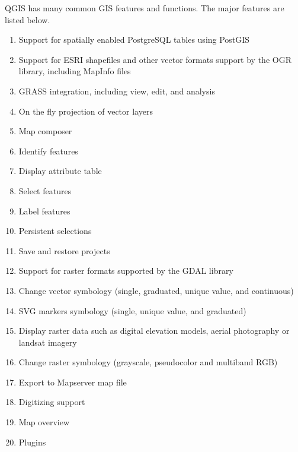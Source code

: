 QGIS has many common GIS features and functions. The major features
are listed below. 

\begin{enumerate}
\item Support for spatially enabled PostgreSQL tables using PostGIS 
\item Support for ESRI shapefiles and other vector formats support by the
OGR library, including MapInfo files 
\item GRASS integration, including view, edit, and analysis
\item On the fly projection of vector layers
\item Map composer
\item Identify features 
\item Display attribute table 
\item Select features 
\item Label features
\item Persistent selections 
\item Save and restore projects
\item Support for raster formats supported by the GDAL library 
\item Change vector symbology (single, graduated, unique value, and continuous) 
\item SVG markers symbology (single, unique value, and graduated) 
\item Display raster data such as digital elevation models, aerial photography
or landsat imagery 
\item Change raster symbology (grayscale, pseudocolor and multiband RGB) 
\item Export to Mapserver map file 
\item Digitizing support
\item Map overview
\item Plugins 
\end{enumerate}


